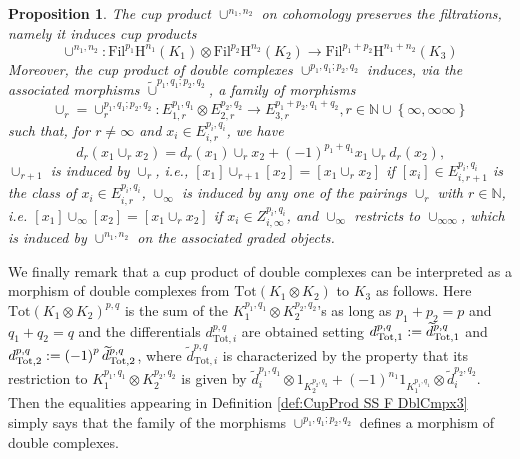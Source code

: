 \documentclass[asterisque,english]{smfart}
\newtheorem{proposition}[theo]{Proposition}
\begin{document}
\begin{proposition}
\label{prop:cupproductspectral} The cup product $\cup ^{n_{1},n_{2}}$ on
cohomology preserves the filtrations, namely it induces cup products 
\begin{equation*}
\cup ^{n_{1},n_{2}}\colon \mathrm{Fil}^{p_{1}}\mathrm{H}^{n_{1}}\left(
K_{1}\right) \otimes \mathrm{Fil}^{p_{2}}\mathrm{H}^{n_{2}}\left(
K_{2}\right) \longrightarrow \mathrm{Fil}^{p_{1}+p_{2}}\mathrm{H}%
^{n_{1}+n_{2}}\left( K_{3}\right) 
\end{equation*}%
Moreover, the cup product of double complexes $\cup
^{p_{1},q_{1};p_{2},q_{2}}$ induces, via the associated morphisms $%
\widetilde{\cup }^{p_{1},q_{1};p_{2},q_{2}}$, a family of morphisms 
\begin{equation*}
\cup _{r}=\cup _{r}^{p_{1},q_{1};p_{2},q_{2}}\colon
E_{1,r}^{p_{1},q_{1}}\otimes E_{2,r}^{p_{2},q_{2}}\rightarrow
E_{3,r}^{p_{1}+p_{2},q_{1}+q_{2}},r\in \mathbb{N\cup }\left\{ \infty ,\infty
\infty \right\} 
\end{equation*}%
such that, for $r\neq \infty $ and $x_{i}\in E_{i,r}^{p_{i},q_{i}}$, we have 
\begin{equation*}
d_{r}\left( x_{1}\cup _{r}x_{2}\right) =d_{r}\left( x_{1}\right) \cup
_{r}x_{2}+(-1)^{p_{1}+q_{1}}x_{1}\cup _{r}d_{r}\left( x_{2}\right) \text{,}
\end{equation*}%
$\cup _{r+1}$ is induced by $\cup _{r}$, i.e., $\left[ x_{1}\right] \cup
_{r+1}\left[ x_{2}\right] =\left[ x_{1}\cup _{r}x_{2}\right] $ if $\left[
x_{i}\right] \in E_{i,r+1}^{p_{i},q_{i}}$ is the class of $x_{i}\in
E_{i,r}^{p_{i},q_{i}}$, $\cup _{\infty }$ is induced by any one of the
pairings $\cup _{r}$ with $r\in \mathbb{N}$, i.e. $\left[ x_{1}\right] \cup
_{\infty }\left[ x_{2}\right] =\left[ x_{1}\cup _{r}x_{2}\right] $ if $%
x_{i}\in Z_{i,\infty }^{p_{i},q_{i}}$, and $\cup _{\infty }$ restricts to $%
\cup _{\infty \infty }$, which is induced by $\cup ^{n_{1},n_{2}}$ on the
associated graded objects.
\end{proposition}

We finally remark that a cup product of double complexes can be interpreted
as a morphism of double complexes from $\mathrm{Tot}\left( K_{1}\otimes
K_{2}\right) $ to $K_{3}$ as follows. Here $\mathrm{Tot}\left( K_{1}\otimes
K_{2}\right) ^{p,q}$ is the sum of the $K_{1}^{p_{1},q_{1}}\otimes
K_{2}^{p_{2},q_{2}}$'s as long as $p_{1}+p_{2}=p$ and $q_{1}+q_{2}=q$ and
the differentials $d_{\mathrm{Tot},i}^{p,q}$ are obtained setting $d_{%
\mathrm{Tot},1}^{p,q}:=\widetilde{d}_{\mathrm{Tot},1}^{p,q}$ and $d_{\mathrm{%
Tot},2}^{p,q}:=\left( -1\right) ^{p}\widetilde{d}_{\mathrm{Tot},2}^{p,q}$,
where $\widetilde{d}_{\mathrm{Tot},i}^{p,q}$ is characterized by the
property that its restriction to $K_{1}^{p_{1},q_{1}}\otimes
K_{2}^{p_{2},q_{2}}$ is given by $\widetilde{d}_{i}^{p_{1},q_{1}}\otimes
1_{K_{2}^{p_{2},q_{2}}}+\left( -1\right)
^{n_{1}}1_{K_{1}^{p_{1},q_{1}}}\otimes \widetilde{d}_{i}^{p_{2},q_{2}}$.
Then the equalities appearing in Definition \ref{def:CupProd SS F DblCmpx3}
simply says that the family of the morphisms $\cup ^{p_{1},q_{1};p_{2},q_{2}}
$ defines a morphism of double complexes.
\end{document}
